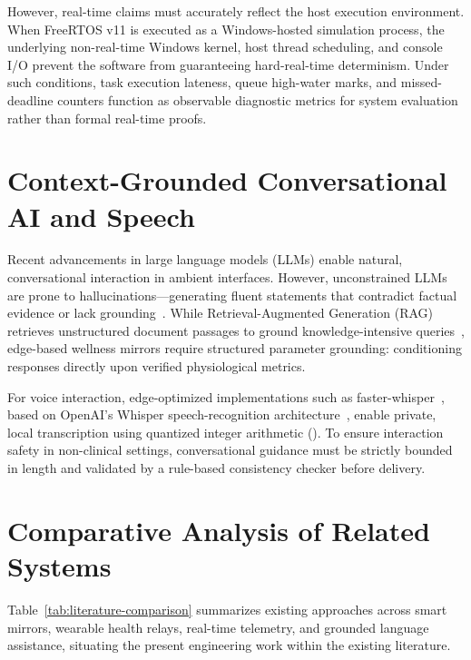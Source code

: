 However, real-time claims must accurately reflect the host execution environment. When FreeRTOS v11 is executed as a Windows-hosted simulation process, the underlying non-real-time Windows kernel, host thread scheduling, and console I/O prevent the software from guaranteeing hard-real-time determinism. Under such conditions, task execution lateness, queue high-water marks, and missed-deadline counters function as observable diagnostic metrics for system evaluation rather than formal real-time proofs.

\section{Context-Grounded Conversational AI and Speech}
Recent advancements in large language models (LLMs) enable natural, conversational interaction in ambient interfaces. However, unconstrained LLMs are prone to hallucinations---generating fluent statements that contradict factual evidence or lack grounding~\cite{ji2023survey}. While Retrieval-Augmented Generation (RAG) retrieves unstructured document passages to ground knowledge-intensive queries~\cite{lewis2020rag}, edge-based wellness mirrors require structured parameter grounding: conditioning responses directly upon verified physiological metrics.

For voice interaction, edge-optimized implementations such as faster-whisper~\cite{fasterWhisper}, based on OpenAI's Whisper speech-recognition architecture~\cite{radford2023whisper}, enable private, local transcription using quantized integer arithmetic (). To ensure interaction safety in non-clinical settings, conversational guidance must be strictly bounded in length and validated by a rule-based consistency checker before delivery.

\section{Comparative Analysis of Related Systems}
Table~\ref{tab:literature-comparison} summarizes existing approaches across smart mirrors, wearable health relays, real-time telemetry, and grounded language assistance, situating the present engineering work within the existing literature.

